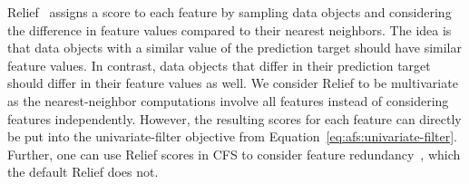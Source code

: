 \documentclass{article}
\theoremstyle{definition}
\begin{document}
Relief~\cite{kira1992feature, robnik1997adaptation} assigns a score to each feature by sampling data objects and considering the difference in feature values compared to their nearest neighbors.
The idea is that data objects with a similar value of the prediction target should have similar feature values.
In contrast, data objects that differ in their prediction target should differ in their feature values as well.
We consider Relief to be multivariate as the nearest-neighbor computations involve all features instead of considering features independently.
However, the resulting scores for each feature can directly be put into the univariate-filter objective from Equation~\ref{eq:afs:univariate-filter}.
Further, one can use Relief scores in CFS to consider feature redundancy~\cite{hall1999correlation, hall2000correlation}, which the default Relief does not.

\renewcommand*{\bibfont}{\small} %
\printbibliography
\end{document}
